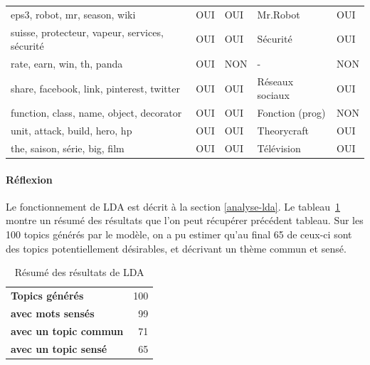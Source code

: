 \begin{longtable}{lllll}
\scriptsize eps3, robot, mr, season, wiki                      & \cellcolor[HTML]{9AFF99}OUI & \cellcolor[HTML]{9AFF99}OUI & Mr.Robot                  & \cellcolor[HTML]{9AFF99}OUI \\
\scriptsize suisse, protecteur, vapeur, services, sécurité     & \cellcolor[HTML]{9AFF99}OUI & \cellcolor[HTML]{9AFF99}OUI & Sécurité                  & \cellcolor[HTML]{9AFF99}OUI \\
\scriptsize rate, earn, win, th, panda                         & \cellcolor[HTML]{9AFF99}OUI & \cellcolor[HTML]{FFCCC9}NON & -                         & \cellcolor[HTML]{FFCCC9}NON \\
\scriptsize share, facebook, link, pinterest, twitter          & \cellcolor[HTML]{9AFF99}OUI & \cellcolor[HTML]{9AFF99}OUI & Réseaux sociaux           & \cellcolor[HTML]{9AFF99}OUI \\
\scriptsize function, class, name, object, decorator           & \cellcolor[HTML]{9AFF99}OUI & \cellcolor[HTML]{9AFF99}OUI & Fonction (prog)           & \cellcolor[HTML]{FFCCC9}NON \\
\scriptsize unit, attack, build, hero, hp                      & \cellcolor[HTML]{9AFF99}OUI & \cellcolor[HTML]{9AFF99}OUI & Theorycraft               & \cellcolor[HTML]{9AFF99}OUI \\
\scriptsize the, saison, série, big, film                      & \cellcolor[HTML]{9AFF99}OUI & \cellcolor[HTML]{9AFF99}OUI & Télévision                & \cellcolor[HTML]{9AFF99}OUI
\end{longtable}

			\paragraph{Réflexion}

				Le fonctionnement de LDA est décrit à la section \ref{analyse-lda}. Le tableau~\ref{resultats-lda} montre un résumé des résultats que l'on peut récupérer précédent tableau. Sur les 100 topics générés par le modèle, on a pu estimer qu'au final 65 de ceux-ci sont des topics potentiellement désirables, et décrivant un thème commun et sensé.

				\FloatBarrier

\begin{table}[h]
\centering
\caption{Résumé des résultats de LDA}
\label{resultats-lda}
\begin{tabular}{lr}
\textbf{Topics générés}            & 100 \\
\textbf{avec mots sensés}           & 99 \\
\textbf{avec un topic commun}       & 71 \\
\textbf{avec un topic sensé}        & 65 \\
\end{tabular}
\end{table}

